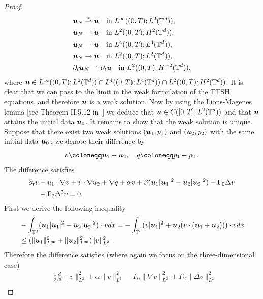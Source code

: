 \documentclass[11pt]{amsart}
\newcommand{\bu}{\mbox{\boldmath$u$}}
\newcommand{\Rb}{\beta}
\newcommand{\Gamzero}{\Gamma_{0}}
\newcommand{\Gamtwo}{\Gamma_{2}}
\theoremstyle{definition}
\numberwithin{equation}{section}
\numberwithin{equation}{section}
\begin{document}
\begin{proof}
\begin{align*}
&\bu_N \overset{\ast}{\rightharpoonup} \bu \quad \text{in } L^\infty ((0,T); L^2 (\mathbb{T}^d)), \\
&\bu_N \rightharpoonup \bu \quad \text{in } L^2 ((0,T); H^2 (\mathbb{T}^d)), \\
&\bu_N \rightharpoonup \bu \quad \text{in } L^4 ((0,T); L^4 (\mathbb{T}^d)), \\
&\bu_N \rightarrow \bu \quad \text{in } L^2 ((0,T); L^2 (\mathbb{T}^d)), \\
&\partial_t \bu_N \rightharpoonup \partial_t \bu \quad \text{in } L^2 ((0,T); H^{-2} (\mathbb{T}^d)),
\end{align*}
where $\bu \in L^\infty ((0,T); L^2 (\mathbb{T}^d)) \cap L^4 ((0,T); L^4 (\mathbb{T}^d)) \cap L^2 ((0,T); H^2 (\mathbb{T}^d))$. It is clear that we can pass to the limit in the weak formulation of the TTSH equations, and therefore $\bu$ is a weak solution. Now by using the Lions-Magenes lemma [see Theorem II.5.12 in~\cite{boyer2012}] we deduce that $\bu \in C([0,T];L^2 (\mathbb{T}^d))$ and that $\bu$ attains the initial data $\bu_0$. It remains to show that the weak solution is unique. Suppose that there exist two weak solutions $(\bu_1, p_1)$ and $(\bu_2, p_2)$ with the same initial data $\bu_0$\,; we denote their difference by
\begin{equation*}
v \coloneqq \bu_1 - \bu_2, \quad q \coloneqq p_1 - p_2\,.
\end{equation*}
The difference satisfies
\begin{align*}
\partial_t v &+ u_1 \cdot \nabla v + v \cdot \nabla u_2 + \nabla q + \alpha v + \Rb ( \bu_1 \lvert \bu_1 \rvert^2 - \bu_2 \lvert \bu_2 \rvert^2 ) + \Gamzero \Delta v \\
&+ \Gamtwo \Delta^2 v = 0\,.
\end{align*}
First we derive the following inequality
\begin{align*}
&-\int_{\mathbb{T}^d} ( \bu_1 \lvert \bu_1 \rvert^2 - \bu_2 \lvert \bu_2 \rvert^2 ) \cdot v dx = - \int_{\mathbb{T}^d} ( v \lvert \bu_1 \rvert^2 + \bu_2 (v \cdot (\bu_1 + \bu_2)) ) \cdot v dx \\
&\leq (\lVert \bu_1 \rVert_{L^\infty}^2 + \lVert \bu_2 \rVert_{L^\infty}^2) \lVert v \rVert_{L^2}^2\,.
\end{align*}
Therefore the difference satisfies (where again we focus on the three-dimensional case)
\begin{align*}
&\frac{1}{2} \frac{d}{d t} \lVert v \rVert_{L^2}^2 + \alpha \lVert v \rVert_{L^2}^{2} - \Gamzero \lVert \nabla v \rVert_{L^2}^2 + \Gamtwo \lVert \Delta v \rVert_{L^2}^2 \\

\end{align*}
\end{proof}
\end{document}
